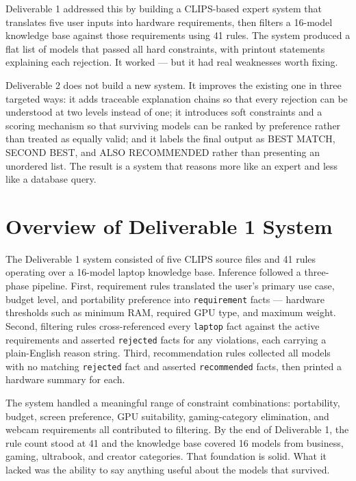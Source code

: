 \documentclass[12pt,a4paper]{article}
\begin{document}
Deliverable 1 addressed this by building a CLIPS-based expert system that translates five user inputs into hardware requirements, then filters a 16-model knowledge base against those requirements using 41 rules. The system produced a flat list of models that passed all hard constraints, with printout statements explaining each rejection. It worked --- but it had real weaknesses worth fixing.

Deliverable 2 does not build a new system. It improves the existing one in three targeted ways: it adds traceable explanation chains so that every rejection can be understood at two levels instead of one; it introduces soft constraints and a scoring mechanism so that surviving models can be ranked by preference rather than treated as equally valid; and it labels the final output as BEST MATCH, SECOND BEST, and ALSO RECOMMENDED rather than presenting an unordered list. The result is a system that reasons more like an expert and less like a database query.

\section{Overview of Deliverable 1 System}

The Deliverable 1 system consisted of five CLIPS source files and 41 rules operating over a 16-model laptop knowledge base. Inference followed a three-phase pipeline. First, requirement rules translated the user's primary use case, budget level, and portability preference into \texttt{requirement} facts --- hardware thresholds such as minimum RAM, required GPU type, and maximum weight. Second, filtering rules cross-referenced every \texttt{laptop} fact against the active requirements and asserted \texttt{rejected} facts for any violations, each carrying a plain-English reason string. Third, recommendation rules collected all models with no matching \texttt{rejected} fact and asserted \texttt{recommended} facts, then printed a hardware summary for each.

The system handled a meaningful range of constraint combinations: portability, budget, screen preference, GPU suitability, gaming-category elimination, and webcam requirements all contributed to filtering. By the end of Deliverable 1, the rule count stood at 41 and the knowledge base covered 16 models from business, gaming, ultrabook, and creator categories. That foundation is solid. What it lacked was the ability to say anything useful about the models that survived.
\end{document}
